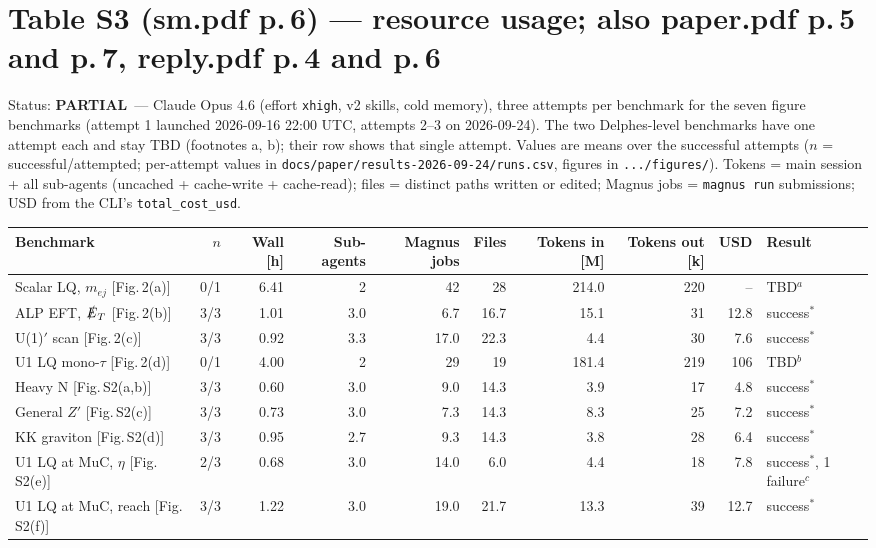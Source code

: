 \documentclass[11pt]{article}
\newcommand{\statuspartial}{\textcolor{orange!80!black}{\textbf{PARTIAL}}}
\begin{document}
\section{Table S3 (sm.pdf p.\,6) --- resource usage; also paper.pdf p.\,5 and p.\,7, reply.pdf p.\,4 and p.\,6}
Status: \statuspartial\ --- Claude Opus 4.6 (effort \texttt{xhigh}, v2 skills, cold memory), three attempts per benchmark
for the seven figure benchmarks (attempt 1 launched 2026-09-16 22:00 UTC, attempts 2--3 on 2026-09-24). The two
Delphes-level benchmarks have one attempt each and stay TBD (footnotes a, b); their row shows that single attempt.
Values are means over the successful attempts ($n$ = successful/attempted; per-attempt values in
\texttt{docs/paper/results-2026-09-24/runs.csv}, figures in \texttt{.../figures/}).
Tokens = main session + all sub-agents (uncached + cache-write + cache-read); files = distinct paths written or edited;
Magnus jobs = \texttt{magnus run} submissions; USD from the CLI's \texttt{total\_cost\_usd}.

\begin{center}\scriptsize\setlength{\tabcolsep}{3pt}
\begin{tabular}{lrrrrrrrrl}
\toprule
Benchmark & $n$ & Wall [h] & Sub-agents & Magnus jobs & Files & Tokens in [M] & Tokens out [k] & USD & Result \\
\midrule
Scalar LQ, $m_{ej}$ [Fig.\,2(a)] & 0/1 & 6.41 & 2 & 42 & 28 & 214.0 & 220 & -- & TBD$^{a}$ \\
ALP EFT, $\slashed{E}_T$ [Fig.\,2(b)] & 3/3 & 1.01 & 3.0 & 6.7 & 16.7 & 15.1 & 31 & 12.8 & success$^{*}$ \\
U(1)$'$ scan [Fig.\,2(c)] & 3/3 & 0.92 & 3.3 & 17.0 & 22.3 & 4.4 & 30 & 7.6 & success$^{*}$ \\
U1 LQ mono-$\tau$ [Fig.\,2(d)] & 0/1 & 4.00 & 2 & 29 & 19 & 181.4 & 219 & 106 & TBD$^{b}$ \\
Heavy N [Fig.\,S2(a,b)] & 3/3 & 0.60 & 3.0 & 9.0 & 14.3 & 3.9 & 17 & 4.8 & success$^{*}$ \\
General $Z'$ [Fig.\,S2(c)] & 3/3 & 0.73 & 3.0 & 7.3 & 14.3 & 8.3 & 25 & 7.2 & success$^{*}$ \\
KK graviton [Fig.\,S2(d)] & 3/3 & 0.95 & 2.7 & 9.3 & 14.3 & 3.8 & 28 & 6.4 & success$^{*}$ \\
U1 LQ at MuC, $\eta$ [Fig.\,S2(e)] & 2/3 & 0.68 & 3.0 & 14.0 & 6.0 & 4.4 & 18 & 7.8 & success$^{*}$, 1 failure$^{c}$ \\
U1 LQ at MuC, reach [Fig.\,S2(f)] & 3/3 & 1.22 & 3.0 & 19.0 & 21.7 & 13.3 & 39 & 12.7 & success$^{*}$ \\
\bottomrule
\end{tabular}
\end{center}
\end{document}
